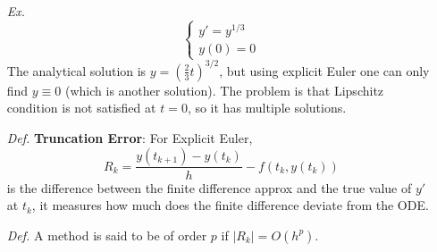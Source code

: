 \documentclass[a4paper, 11pt]{article}
\begin{document}
\begin{itemize}
	\item[\textit{Ex.}] 
	$$
	\begin{cases}
		y'=y^{1/3} \\
		y(0)=0
	\end{cases}
	$$
	The analytical solution is $y=(\frac{2}{3}t)^{3/2}$, but using explicit Euler one can only find $y\equiv0$ (which is another solution). The problem is that Lipschitz condition is not satisfied at $t=0$, so it has multiple solutions.

	\item[\textit{Def.}] \textbf{Truncation Error}: For Explicit Euler, 
	$$
	R_k = \frac{y(t_{k+1})-y({t_k})}{h} - f(t_k, y(t_k))
	$$
	is the difference between the finite difference approx and the true value of $y'$ at $t_k$, it measures how much does the finite difference deviate from the ODE. 

	\item[\textit{Def.}] A method is said to be of order $p$ if $|R_k|=O(h^p)$.
\end{itemize}
\end{document}
